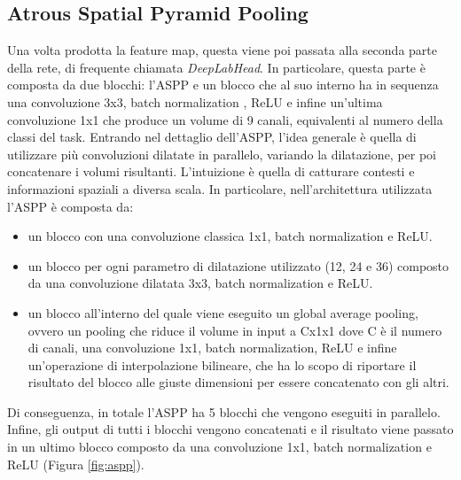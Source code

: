 \subsection{Atrous Spatial Pyramid Pooling}
Una volta prodotta la feature map, questa viene poi passata alla seconda parte della rete, di frequente chiamata  \textit{DeepLabHead}. In particolare, questa parte è composta da due blocchi: l'ASPP e un blocco che al suo interno ha in sequenza una convoluzione 3x3, batch normalization , ReLU e infine un'ultima convoluzione 1x1 che produce un volume di 9 canali, equivalenti al numero della classi del task. Entrando nel dettaglio dell'ASPP, l'idea generale è quella di utilizzare più convoluzioni dilatate in parallelo, variando la dilatazione, per poi concatenare i volumi risultanti. L'intuizione è quella di catturare contesti e informazioni spaziali a diversa scala. In particolare, nell'architettura utilizzata l'ASPP è composta da: 
\begin{itemize}
    \item un blocco con una convoluzione classica 1x1, batch normalization e ReLU.
    
    \item un blocco per ogni parametro di dilatazione utilizzato (12, 24 e 36) composto da una convoluzione dilatata 3x3, batch normalization e ReLU.
    
    \item un blocco all'interno del quale viene eseguito un global average pooling, ovvero un pooling che riduce il volume in input a Cx1x1 dove C è il numero di canali, una convoluzione 1x1, batch normalization, ReLU e infine un'operazione di interpolazione bilineare, che ha lo scopo di riportare il risultato del blocco alle giuste dimensioni per essere concatenato con gli altri.
\end{itemize}

Di conseguenza, in totale l'ASPP ha 5 blocchi che vengono eseguiti in parallelo. Infine, gli output di tutti i blocchi vengono concatenati e il risultato viene passato in un ultimo blocco composto da una convoluzione 1x1, batch normalization e ReLU (Figura \ref{fig:aspp}).

